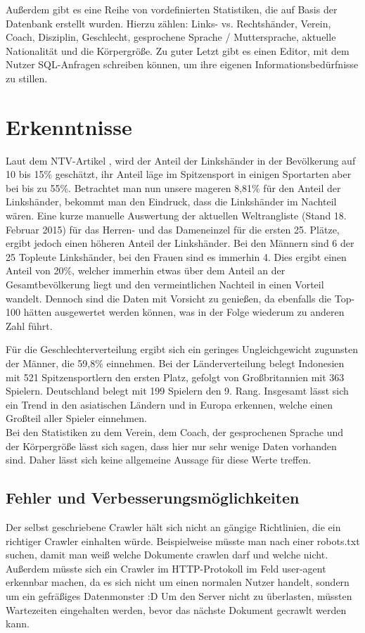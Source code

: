 \documentclass[12pt,a4paper]{scrreprt}
\begin{document}
Außerdem gibt es eine Reihe von vordefinierten Statistiken, die auf Basis der Datenbank erstellt wurden. Hierzu zählen:
Links- vs. Rechtshänder, Verein, Coach, Disziplin, Geschlecht, gesprochene Sprache / Muttersprache, aktuelle Nationalität und die Körpergröße. Zu guter Letzt gibt es einen Editor, mit dem Nutzer SQL-Anfragen schreiben können, um ihre eigenen Informationsbedürfnisse zu stillen.

\chapter{Erkenntnisse}
\label{Erkenntnisse}
Laut dem NTV-Artikel \cite{Hand2015}, wird der Anteil der Linkshänder in der Bevölkerung auf 10 bis 15\% geschätzt, ihr Anteil läge im Spitzensport in einigen Sportarten aber bei bis zu 55\%. Betrachtet man nun unsere mageren 8,81\% für den Anteil der Linkshänder, bekommt man den Eindruck, dass die Linkshänder im Nachteil wären. Eine kurze manuelle Auswertung der aktuellen Weltrangliste (Stand 18. Februar 2015) für das Herren- und das Dameneinzel für die ersten 25. Plätze, ergibt jedoch einen höheren Anteil der Linkshänder. Bei den Männern sind 6 der 25 Topleute Linkshänder, bei den Frauen sind es immerhin 4. Dies ergibt einen Anteil von 20\%, welcher immerhin etwas über dem Anteil an der Gesamtbevölkerung liegt und den vermeintlichen Nachteil in einen Vorteil wandelt. Dennoch sind die Daten mit Vorsicht zu genießen, da ebenfalls die Top-100 hätten ausgewertet werden können, was in der Folge wiederum zu anderen Zahl führt.

Für die Geschlechterverteilung ergibt sich ein geringes Ungleichgewicht zugunsten der Männer, die 59,8\% einnehmen. Bei der Länderverteilung belegt Indonesien mit 521 Spitzensportlern den ersten Platz, gefolgt von Großbritannien mit 363 Spielern. Deutschland belegt mit 199 Spielern den 9. Rang. Insgesamt lässt sich ein Trend in den asiatischen Ländern und in Europa erkennen, welche einen Großteil aller Spieler einnehmen.\\

Bei den Statistiken zu dem Verein, dem Coach, der gesprochenen Sprache und der Körpergröße lässt sich sagen, dass hier nur sehr wenige Daten vorhanden sind. Daher lässt sich keine allgemeine Aussage für diese Werte treffen.

\section{Fehler und Verbesserungsmöglichkeiten}
Der selbst geschriebene Crawler hält sich nicht an gängige Richtlinien, die ein \glqq richtiger\grqq{} Crawler einhalten würde. Beispielweise müsste man nach einer \glqq robots.txt\grqq{} suchen, damit man weiß welche Dokumente crawlen darf und welche nicht. Außerdem müsste sich ein Crawler im HTTP-Protokoll im Feld \glqq user-agent\grqq{} erkennbar machen, da es sich nicht um einen normalen Nutzer handelt, sondern um ein gefräßiges Datenmonster :D Um den Server nicht zu überlasten, müssten Wartezeiten eingehalten werden, bevor das nächste Dokument gecrawlt werden kann.\\
\end{document}

